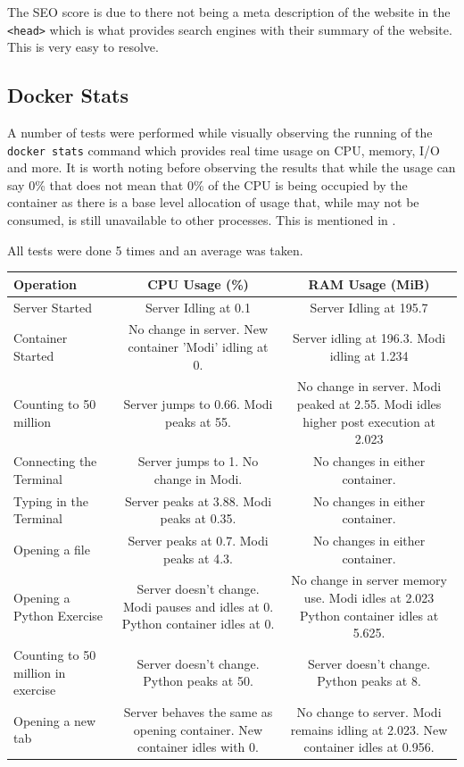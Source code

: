 The SEO score is due to there not being a meta description of the website in the \texttt{<head>} which is what provides search engines with their summary of the website. This is very easy to resolve. 

\subsection{Docker Stats}

A number of tests were performed while visually observing the running of the \texttt{docker stats} command which provides real time usage on CPU, memory, I/O and more. It is worth noting before observing the results that while the usage can say 0\% that does not mean that 0\% of the CPU is being occupied by the container as there is a base level allocation of usage that, while may not be consumed, is still unavailable to other processes. This is mentioned in \cite{docker-perf}.

All tests were done 5 times and an average was taken.


\begin{table}[h!]
    \centering
    \begin{tabulary}{\textwidth}{L|C|C}
        \textbf{Operation} & \textbf{CPU Usage (\%)} & \textbf{RAM Usage (MiB)}\\
        \hline
        Server Started & Server Idling at 0.1 & Server Idling at 195.7\\
        \hline
        Container Started & No change in server. New container 'Modi' idling at 0. & Server idling at 196.3. Modi idling at 1.234\\
        \hline
        Counting to 50 million & Server jumps to 0.66. Modi peaks at 55. & No change in server. Modi peaked at 2.55. Modi idles higher post execution at 2.023\\
        \hline
        Connecting the Terminal & Server jumps to 1. No change in Modi. & No changes in either container.\\
        \hline
        Typing in the Terminal & Server peaks at 3.88. Modi peaks at 0.35. & No changes in either container.\\
        \hline
        Opening a file & Server peaks at 0.7. Modi peaks at 4.3. & No changes in either container.\\
        \hline
        Opening a Python Exercise & Server doesn't change. Modi pauses and idles at 0. Python container idles at 0. & No change in server memory use. Modi idles at 2.023 Python container idles at 5.625.\\
        \hline
        Counting to 50 million in exercise & Server doesn't change. Python peaks at 50. & Server doesn't change. Python peaks at 8.\\
        \hline
        Opening a new tab & Server behaves the same as opening container. New container idles with 0. & No change to server. Modi remains idling at 2.023. New container idles at 0.956.
    \end{tabulary}
\end{table}

